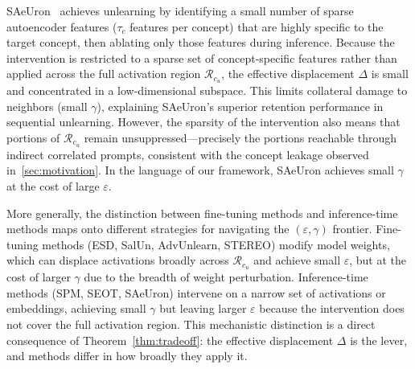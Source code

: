 \begin{remark}
\label{rem:saeuron}
SAeUron~\citep{cywinski2025saeuron} achieves unlearning by identifying a small number of sparse autoencoder features ($\tau_c$ features per concept) that are highly specific to the target concept, then ablating only those features during inference. Because the intervention is restricted to a sparse set of concept-specific features rather than applied across the full activation region $\mathcal{R}_{c_u}$, the effective displacement $\Delta$ is small and concentrated in a low-dimensional subspace. This limits collateral damage to neighbors (small $\gamma$), explaining SAeUron's superior retention performance in sequential unlearning. However, the sparsity of the intervention also means that portions of $\mathcal{R}_{c_u}$ remain unsuppressed---precisely the portions reachable through indirect correlated prompts, consistent with the concept leakage observed in~\cref{sec:motivation}. In the language of our framework, SAeUron achieves small $\gamma$ at the cost of large $\varepsilon$.
\end{remark}

\begin{remark}
\label{rem:finetuning}
More generally, the distinction between fine-tuning methods and inference-time methods maps onto different strategies for navigating the $(\varepsilon, \gamma)$ frontier. Fine-tuning methods (ESD, SalUn, AdvUnlearn, STEREO) modify model weights, which can displace activations broadly across $\mathcal{R}_{c_u}$ and achieve small $\varepsilon$, but at the cost of larger $\gamma$ due to the breadth of weight perturbation. Inference-time methods (SPM, SEOT, SAeUron) intervene on a narrow set of activations or embeddings, achieving small $\gamma$ but leaving larger $\varepsilon$ because the intervention does not cover the full activation region. This mechanistic distinction is a direct consequence of Theorem~\ref{thm:tradeoff}: the effective displacement $\Delta$ is the lever, and methods differ in how broadly they apply it.
\end{remark}



